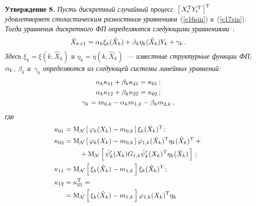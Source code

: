 \begin{multicols}{2}
\noindent
\textbf{Утверждение 8.}
\textit{Пусть дискретный случайный процесс~$\left[\, X_t^{\mathrm{T}} Y_t^{\mathrm{T}}\,\right]^{\mathrm{T}}$ удовлетворяет стохастическим разностным 
уравнениям}~(\ref{e16sin}) \textit{и}~(\ref{e17sin}). \textit{Тогда уравнения дискретного ФП определяются следующими 
уравнениями}~\cite{3sin, 4sin}:
    \begin{equation}
    \hat X_{k+1} =\alpha_k \xi_k (\hat X_k) +\beta_k \eta_k (\hat X_k) Y_k +\gamma_k\,.\label{e51sin}
    \end{equation}
\textit{Здесь $\xi_k =\xi(k, \hat X_k)$ и $\eta_k=\eta(k, \hat X_k)$~--- 
известные структурные функции ФП; $\alpha_k$, $\beta_k$ и~$\gamma_k$ определяются из следующей системы линейных уравнений:}
\begin{gather*}
\alp_k \kappa_{11} +\beta_k \kappa_{21} =\kappa_{01}\,; %
\\
\alp_k \kappa_{12} +\beta_k \kappa_{22} =\kappa_{02}\,; %
\\
\gamma_k = m_{0,k} -\alp_k m_{1,k} -\beta_k m_{2,k}\,, %
\end{gather*}
где 
    \begin{align*}
 \kappa_{01}&=\mm_{\cal N} \lk \vrp_k (X_k) - m_{0,k}\rk \xi_k (\hat X_k)^{\mathrm{T}}\,;\\
\kappa_{02}&=\mm_{\cal N} \lk \vrp_k (X_k) - m_{0,k}\rk \vrp_{1,k} (\hat X_k)^{\mathrm{T}} \eta_k (\hat X_k)^{\mathrm{T}}+{}\\
&\hspace*{8mm}{}+        \mm_{\cal N} \lk \bar \psi_k' (X_k) G_{1,k} \bar \psi_k' (X_k)^{\mathrm{T}} \eta_k (\hat X_k) \rk\,;\\ %
\kappa_{11}&=\mm_{\cal N} \lk \xi_k (\hat X_k) - m_{1,k}\rk \xi_k (\hat X_k)^{\mathrm{T}}\,;\\%
\kappa_{12}&=\kappa_{21}^{\mathrm{T}}={}\\
&{}=\mm_{\cal N} \lk \xi_k (\hat X_k) - m_{1,k}\rk \vrp_{1,k}(X_k)^{\mathrm{T}} \eta_k 

\end{align*}
\end{multicols}
